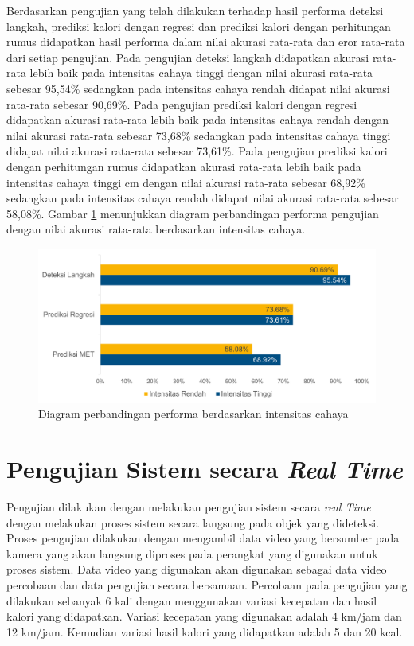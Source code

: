 Berdasarkan pengujian yang telah dilakukan terhadap hasil performa deteksi langkah, prediksi kalori dengan regresi dan prediksi kalori dengan perhitungan rumus didapatkan hasil performa dalam nilai akurasi rata-rata dan eror rata-rata dari setiap pengujian. Pada pengujian deteksi langkah didapatkan akurasi rata-rata lebih baik pada intensitas cahaya tinggi dengan nilai akurasi rata-rata sebesar 95,54\% sedangkan pada intensitas cahaya rendah didapat nilai akurasi rata-rata sebesar 90,69\%. Pada pengujian prediksi kalori dengan regresi didapatkan akurasi rata-rata lebih baik pada intensitas cahaya rendah dengan nilai akurasi rata-rata sebesar 73,68\% sedangkan pada intensitas cahaya tinggi didapat nilai akurasi rata-rata sebesar 73,61\%. Pada pengujian prediksi kalori dengan perhitungan rumus didapatkan akurasi rata-rata lebih baik pada intensitas cahaya tinggi cm dengan nilai akurasi rata-rata sebesar 68,92\% sedangkan pada intensitas cahaya rendah didapat nilai akurasi rata-rata sebesar 58,08\%. Gambar \ref{fig:DiagramPosisi} menunjukkan diagram perbandingan performa pengujian dengan nilai akurasi rata-rata berdasarkan intensitas cahaya.

\begin{figure}[H]
  \centering
  \includegraphics[scale=0.7]{gambar/diagram_cahaya.png}
  \caption{Diagram perbandingan performa berdasarkan intensitas cahaya}
  \label{fig:DiagramPosisi}
\end{figure}

\section{Pengujian Sistem secara \emph{Real Time}}
\label{sec:PengujianRealTime}

Pengujian dilakukan dengan melakukan pengujian sistem secara \emph{real Time} dengan melakukan proses sistem secara langsung pada objek yang dideteksi. Proses pengujian dilakukan dengan mengambil data video yang bersumber pada kamera yang akan langsung diproses pada perangkat yang digunakan untuk proses sistem. Data video yang digunakan akan digunakan sebagai data video percobaan dan data pengujian secara bersamaan. Percobaan pada pengujian yang dilakukan sebanyak 6 kali dengan menggunakan variasi kecepatan dan hasil kalori yang didapatkan. Variasi kecepatan yang digunakan adalah 4 km/jam dan 12 km/jam. Kemudian variasi hasil kalori yang didapatkan adalah 5 dan 20 kcal.

